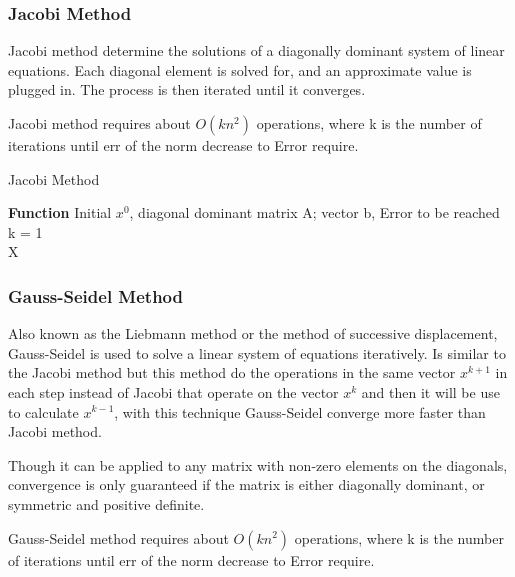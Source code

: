 \documentclass[letterpaper,12pt]{article}
\begin{document}
\subsubsection{Jacobi Method}

Jacobi method determine the solutions of a diagonally dominant system of linear equations. Each diagonal element is solved for, and an approximate value is plugged in. The process is then iterated until it converges. 

Jacobi method requires about $O(kn^2)$ operations, where k is the number of iterations until err of the norm decrease to Error require.

\begin{center}
\begin{algorithm}[H]
   \caption{Jacobi Method}
   \textbf{Function} Initial $x^0$, diagonal dominant matrix A; vector b, Error to be reached\\
   k = 1 \\
   \Return X
  \end{algorithm}  
\end{center}

\subsubsection{Gauss-Seidel Method}

Also known as the Liebmann method or the method of successive displacement, Gauss-Seidel is used to solve a linear system of equations iteratively. Is similar to the Jacobi method but this method do the operations in the same vector $x^{k+1}$ in each step instead of Jacobi that operate on the vector $x^k$ and then it will be use to calculate $x^{k-1}$, with this technique Gauss-Seidel converge more faster than Jacobi method.

Though it can be applied to any matrix with non-zero elements on the diagonals, convergence is only guaranteed if the matrix is either diagonally dominant, or symmetric and positive definite. 

Gauss-Seidel method requires about $O(kn^2)$ operations, where k is the number of iterations until err of the norm decrease to Error require.
\end{document}
